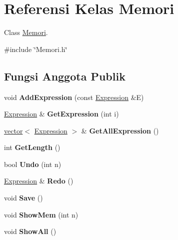 \hypertarget{classMemori}{}\section{Referensi Kelas Memori}
\label{classMemori}


Class \hyperlink{classMemori}{Memori}.  




{\ttfamily \#include \char`\"{}Memori.\+h\char`\"{}}

\subsection*{Fungsi Anggota Publik}
\begin{DoxyCompactItemize}
\item 
\hypertarget{classMemori_a23ded2c06e083765b179044017d4568a}{}void {\bfseries Add\+Expression} (const \hyperlink{classExpression}{Expression} \&E)\label{classMemori_a23ded2c06e083765b179044017d4568a}

\item 
\hypertarget{classMemori_a7a31731f8c96c7d1b88341c8e30f736c}{}\hyperlink{classExpression}{Expression} \& {\bfseries Get\+Expression} (int i)\label{classMemori_a7a31731f8c96c7d1b88341c8e30f736c}

\item 
\hypertarget{classMemori_a1d24e2a91215739281ce457f30daa1de}{}\hyperlink{classvector}{vector}$<$ \hyperlink{classExpression}{Expression} $>$ \& {\bfseries Get\+All\+Expression} ()\label{classMemori_a1d24e2a91215739281ce457f30daa1de}

\item 
\hypertarget{classMemori_a1d60446414aff4f88bc9a478c56fe4c9}{}int {\bfseries Get\+Length} ()\label{classMemori_a1d60446414aff4f88bc9a478c56fe4c9}

\item 
\hypertarget{classMemori_ad992ea2a1b19e5fd131f93bac469bd68}{}bool {\bfseries Undo} (int n)\label{classMemori_ad992ea2a1b19e5fd131f93bac469bd68}

\item 
\hypertarget{classMemori_a023b90b740fb802f5c480ab9057f23b2}{}\hyperlink{classExpression}{Expression} \& {\bfseries Redo} ()\label{classMemori_a023b90b740fb802f5c480ab9057f23b2}

\item 
\hypertarget{classMemori_a50d47e3155b87094ea21706cfc5f3b09}{}void {\bfseries Save} ()\label{classMemori_a50d47e3155b87094ea21706cfc5f3b09}

\item 
\hypertarget{classMemori_a54eee01b6f3e33fbecd84bb8e9f44504}{}void {\bfseries Show\+Mem} (int n)\label{classMemori_a54eee01b6f3e33fbecd84bb8e9f44504}

\item 
\hypertarget{classMemori_a6b3d1bc5a0fd7c61546741ec96ff50ad}{}void {\bfseries Show\+All} ()\label{classMemori_a6b3d1bc5a0fd7c61546741ec96ff50ad}

\end{DoxyCompactItemize}

